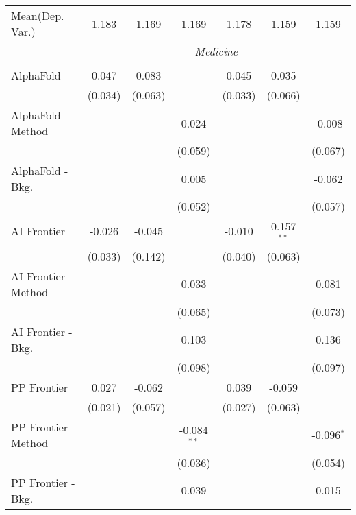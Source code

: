 \begin{tabular}{lcccccc}
Mean(Dep. Var.) & 1.183 & 1.169 & 1.169 & 1.178 & 1.159 & 1.159 \\
 & \multicolumn{6}{c}{\textit{Medicine}} \\ \\
   AlphaFold            & 0.047   & 0.083        &               & 0.045   & 0.035        &   \\   
                        & (0.034) & (0.063)      &               & (0.033) & (0.066)      &   \\   
   AlphaFold - Method   &         &              & 0.024         &         &              & -0.008\\   
                        &         &              & (0.059)       &         &              & (0.067)\\   
   AlphaFold - Bkg.     &         &              & 0.005         &         &              & -0.062\\   
                        &         &              & (0.052)       &         &              & (0.057)\\   
   AI Frontier          & -0.026  & -0.045       &               & -0.010  & 0.157$^{**}$ &   \\   
                        & (0.033) & (0.142)      &               & (0.040) & (0.063)      &   \\   
   AI Frontier - Method &         &              & 0.033         &         &              & 0.081\\   
                        &         &              & (0.065)       &         &              & (0.073)\\   
   AI Frontier - Bkg.   &         &              & 0.103         &         &              & 0.136\\   
                        &         &              & (0.098)       &         &              & (0.097)\\   
   PP Frontier          & 0.027   & -0.062       &               & 0.039   & -0.059       &   \\   
                        & (0.021) & (0.057)      &               & (0.027) & (0.063)      &   \\   
   PP Frontier - Method &         &              & -0.084$^{**}$ &         &              & -0.096$^{*}$\\   
                        &         &              & (0.036)       &         &              & (0.054)\\   
   PP Frontier - Bkg.   &         &              & 0.039         &         &              & 0.015\\   

\end{tabular}
